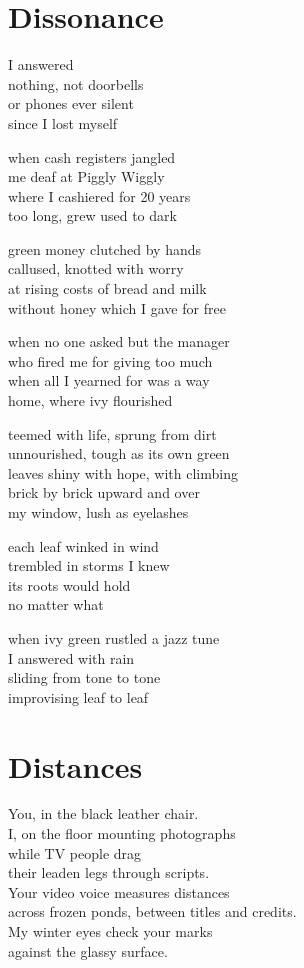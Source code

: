 \documentclass[twoside,10pt]{book}
\begin{document}
\clearpage
\section{Dissonance}

I answered\\
nothing, not doorbells\\
or phones ever silent\\
since I lost myself

when cash registers jangled\\
me deaf at Piggly Wiggly\\
where I cashiered for 20 years\\
too long, grew used to dark

green money clutched by hands\\
callused, knotted with worry\\
at rising costs of bread and milk\\
without honey which I gave for free

when no one asked but the manager\\
who fired me for giving too much\\
when all I yearned for was a way\\
home, where ivy flourished

teemed with life, sprung from dirt\\
unnourished, tough as its own green\\
leaves shiny with hope, with climbing\\
brick by brick upward and over\\
my window, lush as eyelashes

each leaf winked in wind\\
trembled in storms I knew\\
its roots would hold\\
no matter what

when ivy green rustled a jazz tune\\
I answered with rain\\
sliding from tone to tone\\
improvising leaf to leaf


\clearpage
\section{Distances}

You, in the black leather chair.\\
I, on the floor mounting photographs\\
while TV people drag\\
their leaden legs through scripts.\\
Your video voice measures distances\\
across frozen ponds, between titles and credits.\\
My winter eyes check your marks\\
against the glassy surface.
\end{document}
